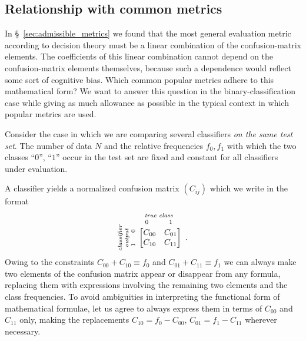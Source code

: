 \documentclass[\ifafour a4paper,12pt,\else a5paper,10pt,\fi%
onecolumn,oneside,article,%
british%
]{memoir}
\theoremstyle{remark}
\theoremstyle{innote}
\renewcommand*{\|}[1][]{\nonscript\:#1\vert\nonscript\:\mathopen{}}
\newcommand*{\sect}{\S}%
\newcommand*{\umatrix}[4]{\begin{bmatrix*}[r]#1&#2\\#3&#4\end{bmatrix*}}
\begin{document}
\subsection{Relationship with common metrics}
\label{sec:common_metrics}

In \sect~\ref{sec:admissible_metrics} we found that the most general evaluation metric according to decision theory must be a linear combination of the confusion-matrix elements. The coefficients of this linear combination cannot depend on the confusion-matrix elements themselves, because such a dependence would reflect some sort of cognitive bias. Which common popular metrics adhere to this mathematical form? We want to answer this question in the binary-classification case while giving as much allowance as possible in the typical context in which popular metrics are used.

Consider the case in which we are comparing several classifiers \emph{on the same test set}. The number of data $N$ and the relative frequencies $f_{0}, f_{1}$ with which the two classes \enquote{$0$}, \enquote{$1$} occur in the test set are fixed and constant for all classifiers under evaluation.

A classifier yields a normalized confusion matrix $(C_{ij})$ which we write in the format
\begin{equation*}
  \rotatebox[origin=c]{90}{
    \clap{\textit{\parbox{5em}{\centering\scriptsize classifier\\output\\$1\hspace{1.5em}0$}}
    }}\ 
    \overbracket[0pt]{
      \umatrix{ C_{00} }{ C_{01} }{ C_{10} }{ C_{11}
      }}^{
      \clap{\textit{\parbox{6em}{\centering\scriptsize true class\\$0\hspace{3em}1$}}
    }} \ .
\end{equation*}

Owing to the constraints $C_{00} + C_{10} \equiv f_{0}$ and $C_{01} + C_{11} \equiv f_{1}$ we can always make two elements of the confusion matrix appear or disappear from any formula, replacing them with expressions involving the remaining two elements and the class frequencies. To avoid ambiguities in interpreting the functional form of mathematical formulae, let us agree to always express them in terms of $C_{00}$ and $C_{11}$ only, making the replacements $C_{10} = f_{0} - C_{00}$, $C_{01} = f_{1} - C_{11}$ wherever necessary.
\end{document}
